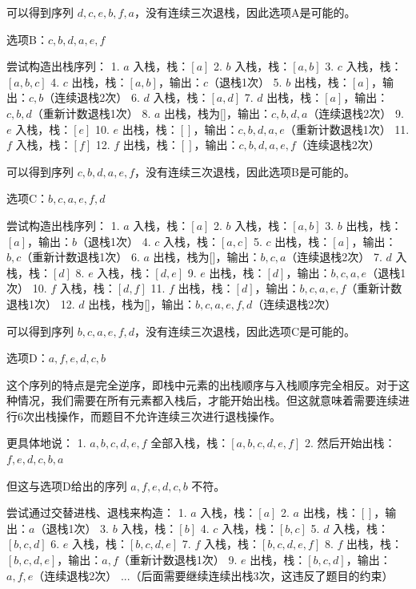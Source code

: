 \documentclass[lang=cn,newtx,10pt,scheme=chinese]{../../../elegantbook}
\begin{document}
\begin{enumerate}
    可以得到序列 $d, c, e, b, f, a$，没有连续三次退栈，因此选项A是可能的。

    选项B：$c, b, d, a, e, f$
    
    尝试构造出栈序列：
    1. $a$ 入栈，栈：$[a]$
    2. $b$ 入栈，栈：$[a, b]$
    3. $c$ 入栈，栈：$[a, b, c]$
    4. $c$ 出栈，栈：$[a, b]$，输出：$c$（退栈1次）
    5. $b$ 出栈，栈：$[a]$，输出：$c, b$（连续退栈2次）
    6. $d$ 入栈，栈：$[a, d]$
    7. $d$ 出栈，栈：$[a]$，输出：$c, b, d$（重新计数退栈1次）
    8. $a$ 出栈，栈为[]，输出：$c, b, d, a$（连续退栈2次）
    9. $e$ 入栈，栈：$[e]$
    10. $e$ 出栈，栈：$[]$，输出：$c, b, d, a, e$（重新计数退栈1次）
    11. $f$ 入栈，栈：$[f]$
    12. $f$ 出栈，栈：$[]$，输出：$c, b, d, a, e, f$（连续退栈2次）
    
    可以得到序列 $c, b, d, a, e, f$，没有连续三次退栈，因此选项B是可能的。

    选项C：$b, c, a, e, f, d$
    
    尝试构造出栈序列：
    1. $a$ 入栈，栈：$[a]$
    2. $b$ 入栈，栈：$[a, b]$
    3. $b$ 出栈，栈：$[a]$，输出：$b$（退栈1次）
    4. $c$ 入栈，栈：$[a, c]$
    5. $c$ 出栈，栈：$[a]$，输出：$b, c$（重新计数退栈1次）
    6. $a$ 出栈，栈为[]，输出：$b, c, a$（连续退栈2次）
    7. $d$ 入栈，栈：$[d]$
    8. $e$ 入栈，栈：$[d, e]$
    9. $e$ 出栈，栈：$[d]$，输出：$b, c, a, e$（退栈1次）
    10. $f$ 入栈，栈：$[d, f]$
    11. $f$ 出栈，栈：$[d]$，输出：$b, c, a, e, f$（重新计数退栈1次）
    12. $d$ 出栈，栈为[]，输出：$b, c, a, e, f, d$（连续退栈2次）
    
    可以得到序列 $b, c, a, e, f, d$，没有连续三次退栈，因此选项C是可能的。

    选项D：$a, f, e, d, c, b$
    
    这个序列的特点是完全逆序，即栈中元素的出栈顺序与入栈顺序完全相反。对于这种情况，我们需要在所有元素都入栈后，才能开始出栈。但这就意味着需要连续进行6次出栈操作，而题目不允许连续三次进行退栈操作。

    更具体地说：
    1. $a, b, c, d, e, f$ 全部入栈，栈：$[a, b, c, d, e, f]$
    2. 然后开始出栈：$f, e, d, c, b, a$
    
    但这与选项D给出的序列 $a, f, e, d, c, b$ 不符。

    尝试通过交替进栈、退栈来构造：
    1. $a$ 入栈，栈：$[a]$
    2. $a$ 出栈，栈：$[]$，输出：$a$（退栈1次）
    3. $b$ 入栈，栈：$[b]$
    4. $c$ 入栈，栈：$[b, c]$
    5. $d$ 入栈，栈：$[b, c, d]$
    6. $e$ 入栈，栈：$[b, c, d, e]$
    7. $f$ 入栈，栈：$[b, c, d, e, f]$
    8. $f$ 出栈，栈：$[b, c, d, e]$，输出：$a, f$（重新计数退栈1次）
    9. $e$ 出栈，栈：$[b, c, d]$，输出：$a, f, e$（连续退栈2次）
    ...（后面需要继续连续出栈3次，这违反了题目的约束）
    

\end{enumerate}
\end{document}
